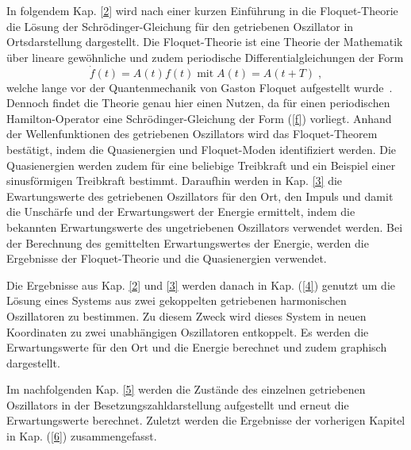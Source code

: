 In folgendem Kap. \ref{2} wird nach einer kurzen Einführung in die Floquet-Theorie die Lösung der Schrödinger-Gleichung für den getriebenen Oszillator in Ortsdarstellung dargestellt.
Die Floquet-Theorie ist eine Theorie der Mathematik über lineare gewöhnliche und zudem periodische Differentialgleichungen der Form
\begin{equation}
  \dot f(t)=A(t)f(t)\;\text{mit}\; A(t)=A(t+T) \; ,
  \label{f}
\end{equation}
welche lange vor der Quantenmechanik von Gaston Floquet aufgestellt wurde~\cite{haengi}.
Dennoch findet die Theorie genau hier einen Nutzen, da für einen periodischen Hamilton-Operator eine Schrödinger-Gleichung der Form (\ref{f}) vorliegt.
Anhand der Wellenfunktionen des getriebenen Oszillators wird das Floquet-Theorem bestätigt, indem die Quasienergien und Floquet-Moden identifiziert werden.
Die Quasienergien werden zudem für eine beliebige Treibkraft und ein Beispiel einer sinusförmigen Treibkraft bestimmt.
Daraufhin werden in Kap. \ref{3} die Ewartungswerte des getriebenen Oszillators für den Ort, den Impuls und damit die Unschärfe und der Erwartungswert der Energie ermittelt, indem die bekannten Erwartungswerte des ungetriebenen Oszillators verwendet werden.
Bei der Berechnung des gemittelten Erwartungswertes der Energie, werden die Ergebnisse der Floquet-Theorie und die Quasienergien verwendet.
\iffalse
Die Ergebnisse aus Kap. \ref{2} und \ref{3} werden danach in Kap. \ref{4} genutzt um die Lösung sowie die Erwartungswerte eines Systems aus zwei gekoppelten getriebenen harmonischen Oszillatoren zu bestimmen.
Die Erwartungswerte für den Ort und die Energie werden graphisch dargestellt und kommentiert.
Zu diesem Zweck wird dieses System in neuen Koordinaten zu zwei unabhängigen Oszillatoren entkoppelt.
\fi
Die Ergebnisse aus Kap. \ref{2} und \ref{3} werden danach in Kap. (\ref{4}) genutzt um die Lösung eines Systems aus zwei gekoppelten getriebenen harmonischen Oszillatoren zu bestimmen.
Zu diesem Zweck wird dieses System in neuen Koordinaten zu zwei unabhängigen Oszillatoren entkoppelt.
Es werden die Erwartungswerte für den Ort und die Energie berechnet und zudem graphisch dargestellt.

Im nachfolgenden Kap. \ref{5} werden die Zustände des einzelnen getriebenen Oszillators in der Besetzungszahldarstellung aufgestellt und erneut die Erwartungswerte berechnet.
Zuletzt werden die Ergebnisse der vorherigen Kapitel in Kap. (\ref{6}) zusammengefasst.

